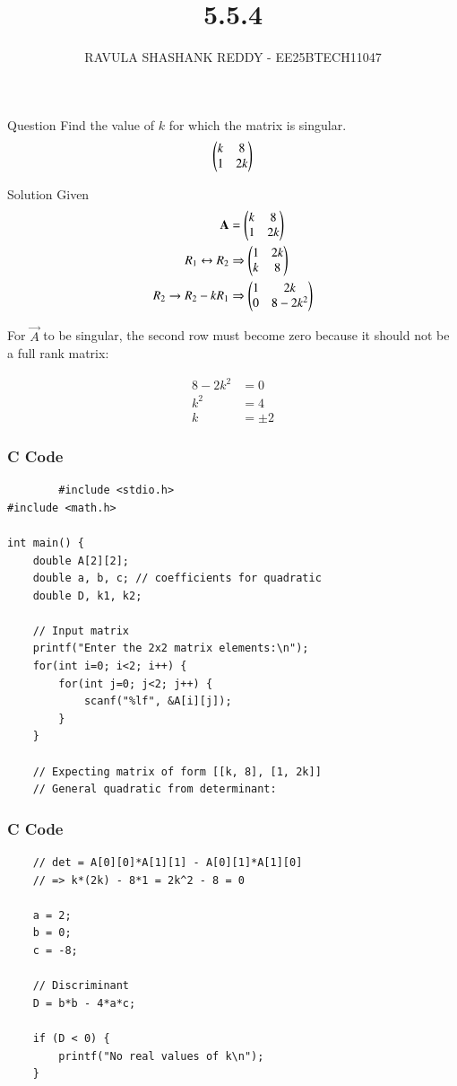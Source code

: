 \documentclass{beamer}
\title %
{5.5.4}
\author %
{RAVULA SHASHANK REDDY - EE25BTECH11047}
\begin{document}
	
	
	\frame{\titlepage}
	\begin{frame}{Question}
    Find the value of $k$ for which the matrix is singular.
\begin{align*}
\begin{pmatrix}k & 8 \\ 1 & 2k\end{pmatrix}
\end{align*}

\end{frame}
\begin{frame}{Solution}
    Given
\begin{align}
\mathbf{A}&= \begin{pmatrix}k & 8 \\ 1 & 2k\end{pmatrix} \\
R_1 \leftrightarrow R_2 &\Rightarrow \begin{pmatrix}1 & 2k \\ k & 8\end{pmatrix} \\
R_2 \to R_2 - kR_1 &\Rightarrow \begin{pmatrix}1 & 2k \\ 0 & 8 - 2k^2\end{pmatrix} 
\end{align}

For $\vec{A}$ to be singular, the second row must become zero because it should not be a full rank matrix: 

\begin{align}
8 - 2k^2 &= 0 \\
k^2 &= 4 \\
k &= \pm 2 
\end{align}

\end{frame}
\begin{frame}[fragile]
    \frametitle{C Code}
    \begin{lstlisting}
        #include <stdio.h>
#include <math.h>

int main() {
    double A[2][2];
    double a, b, c; // coefficients for quadratic
    double D, k1, k2;

    // Input matrix
    printf("Enter the 2x2 matrix elements:\n");
    for(int i=0; i<2; i++) {
        for(int j=0; j<2; j++) {
            scanf("%lf", &A[i][j]);
        }
    }

    // Expecting matrix of form [[k, 8], [1, 2k]]
    // General quadratic from determinant:
    \end{lstlisting}
    \end{frame}
\begin{frame}[fragile]
    \frametitle{C Code}
    \begin{lstlisting}
    // det = A[0][0]*A[1][1] - A[0][1]*A[1][0]
    // => k*(2k) - 8*1 = 2k^2 - 8 = 0

    a = 2;
    b = 0;
    c = -8;

    // Discriminant
    D = b*b - 4*a*c;

    if (D < 0) {
        printf("No real values of k\n");
    }
     \end{lstlisting}
    \end{frame}
\end{document}
